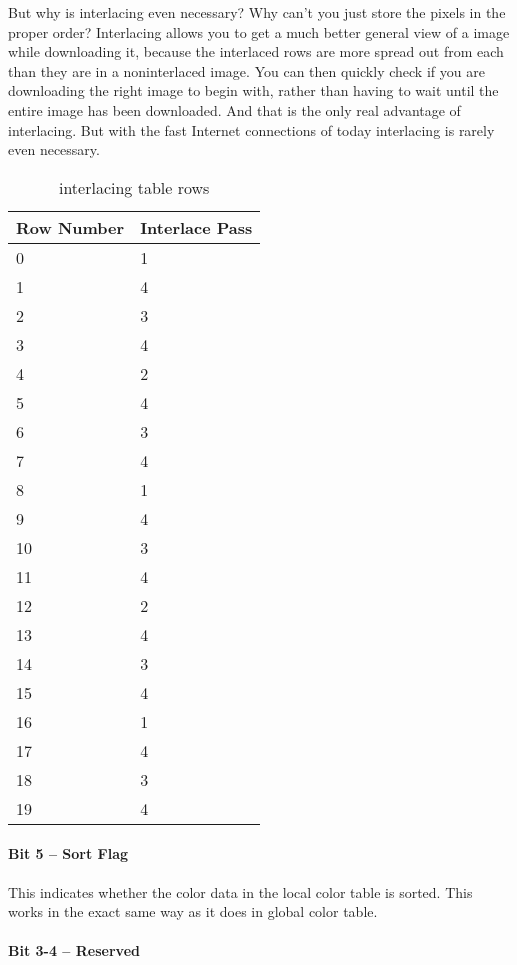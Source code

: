 But why is interlacing even necessary? Why can't you just store the
pixels in the proper order? Interlacing allows you to get a much
better general view of a \gif image while downloading it, because the
interlaced rows are more spread out from each than they are in a
noninterlaced image. You can then quickly check if you are downloading
the right image to begin with, rather than having to wait until the
entire image has been downloaded. And that is the only real advantage
of interlacing. But with the fast Internet connections of today
interlacing is rarely even necessary.


\begin{table}
  \centering
  \begin{tabular}{ll}
    \toprule
    Row Number & Interlace Pass \\
    \midrule
    0 & 1 \\
    1 & 4 \\
    2 & 3 \\
    3 & 4 \\
    4 & 2 \\
    5 & 4 \\
    6 & 3 \\
    7 & 4 \\
    8 & 1 \\
    9 & 4 \\
    10 & 3 \\
    11 & 4 \\
    12 & 2 \\
    13 & 4 \\
    14 & 3 \\
    15 & 4 \\
    16 & 1 \\
    17 & 4 \\
    18 & 3 \\
    19 & 4 \\
    \bottomrule
  \end{tabular}
  \caption{\gif interlacing table rows}
  \label{tab:gif-interlacing}
\end{table}

\paragraph{Bit 5 -- Sort Flag}

This indicates whether the color data in the local color table is
sorted. This works in the exact same way as it does in global color
table.

\paragraph{Bit 3-4 -- Reserved}

